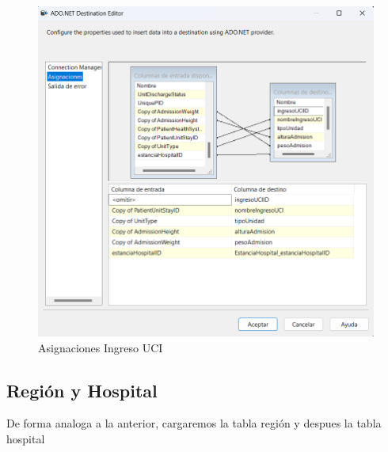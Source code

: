 \documentclass{article}
\begin{document}
	\begin{figure}[H]
		\centering
		\includegraphics[width=.7\linewidth]{./images/asignaciones/ingreso_uci.png}
		\caption{Asignaciones Ingreso UCI}
	\end{figure}

	\subsection{Región y Hospital}
	De forma analoga a la anterior, cargaremos la tabla región y despues la tabla hospital
\end{document}
